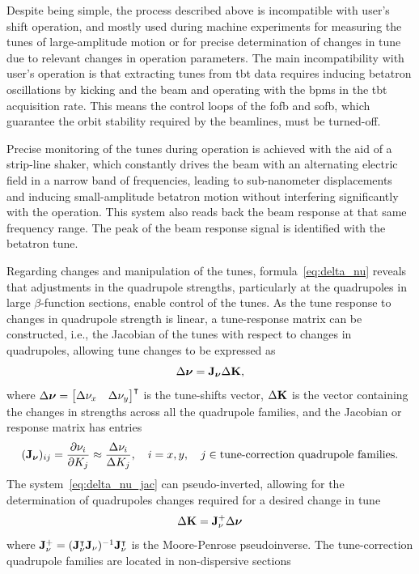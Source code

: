 Despite being simple, the process described above is incompatible with user's shift operation, and mostly used during machine experiments for measuring the tunes of large-amplitude motion or for precise determination of changes in tune due to relevant changes in operation parameters. The main incompatibility with user's operation is that extracting tunes from \gls*{tbt} data requires inducing betatron oscillations by kicking and the beam and operating with the \glspl*{bpm} in the \gls*{tbt} acquisition rate. This means the control loops of the \gls*{fofb} and \gls*{sofb}, which guarantee the orbit stability required by the beamlines, must be turned-off. 

Precise  monitoring of the tunes during operation is achieved with the aid of a strip-line shaker, which constantly drives the beam with an alternating electric field in a narrow band of frequencies, leading to sub-nanometer displacements and inducing small-amplitude betatron motion without interfering significantly with the operation. This system also reads back the beam response at that same frequency range. The peak of the beam response signal is identified with the betatron tune.

Regarding changes and manipulation of the tunes, formula~\eqref{eq:delta_nu} reveals that adjustments in the quadrupole strengths, particularly at the quadrupoles in large $\beta$-function sections, enable control of the tunes. As the tune response to changes in quadrupole strength is linear, a tune-response matrix can be constructed, i.e., the Jacobian of the tunes with respect to changes in quadrupoles, allowing tune changes to be expressed as
\begin{equation}
    \Delta\boldsymbol{\nu} = \vb{J}_{\boldsymbol{\nu}}\Delta \vb{K},
    \label{eq:delta_nu_jac}
\end{equation}
where $\Delta\boldsymbol{\nu} = \mqty*[\Delta \nu_x & \Delta \nu_y]^\intercal$ is the tune-shifts vector, $\Delta \vb{K}$ is the vector containing the changes in strengths across all the quadrupole families, and the Jacobian or response matrix has entries
\begin{equation}
    (\vb{J}_{\boldsymbol{\nu}})_{ij} = \pdv{\nu_{i}}{K_j} \approx \frac{\Delta \nu_{i}}{\Delta K_j}, \quad i=x, y,\quad j\in\text{tune-correction quadrupole families}.
\end{equation}
The system~\eqref{eq:delta_nu_jac} can pseudo-inverted, allowing for the determination of quadrupoles changes required for a desired change in tune
\begin{equation}
    \Delta \vb{K} = \vb{J}_{\nu}^{+}\Delta \boldsymbol{\nu}
\end{equation}
where $\vb{J}_{\nu}^{+} = (\vb{J}_{\nu}^{\intercal}\vb{J}_{\nu})^{-1}\vb{J}_{\nu}^{\intercal}$ is the Moore-Penrose pseudoinverse. 
The tune-correction quadrupole families are located in non-dispersive sections 
